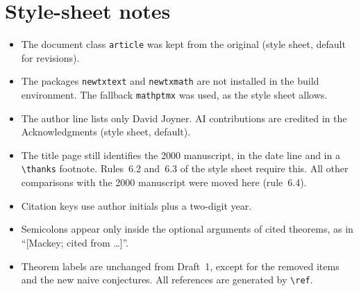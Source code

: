 \documentclass[12pt,letterpaper]{article}
\begin{document}
\section{Style-sheet notes}\label{sec:style}

\begin{itemize}[itemsep=1pt]
\item The document class \texttt{article} was kept from the original
  (style sheet, default for revisions).
\item The packages \texttt{newtxtext} and \texttt{newtxmath} are not
  installed in the build environment. The fallback \texttt{mathptmx} was
  used, as the style sheet allows.
\item The author line lists only David Joyner. AI contributions are credited
  in the Acknowledgments (style sheet, default).
\item The title page still identifies the 2000 manuscript, in the date line
  and in a \verb|\thanks| footnote. Rules~6.2 and~6.3 of the style sheet
  require this. All other comparisons with the 2000 manuscript were moved
  here (rule~6.4).
\item Citation keys use author initials plus a two-digit year.
\item Semicolons appear only inside the optional arguments of cited
  theorems, as in ``[Mackey; cited from \dots]''.
\item Theorem labels are unchanged from Draft~1, except for the removed
  items and the new naive conjectures. All references are generated by
  \verb|\ref|.
\end{itemize}
\end{document}
